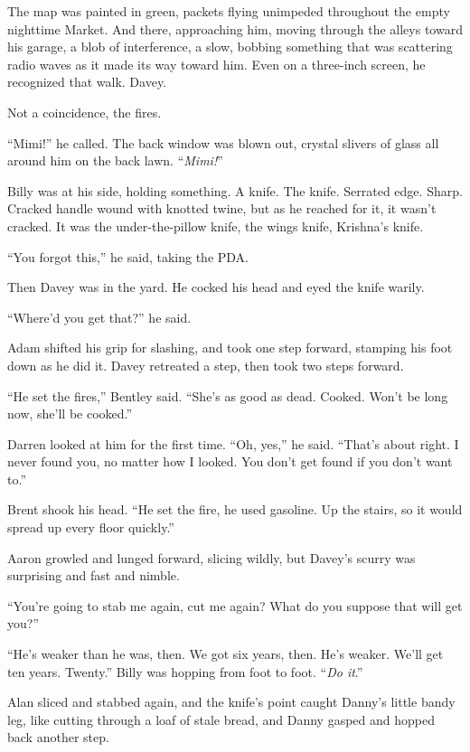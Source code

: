 \documentclass{article}
\begin{document}
The map was painted in green, packets flying unimpeded throughout the
empty nighttime Market.  And there, approaching him, moving through
the alleys toward his garage, a blob of interference, a slow, bobbing
something that was scattering radio waves as it made its way toward
him.  Even on a three-inch screen, he recognized that walk.  Davey.

Not a coincidence, the fires.

``Mimi!'' he called.  The back window was blown out, crystal slivers
of glass all around him on the back lawn.  ``\textit{Mimi!}''

Billy was at his side, holding something.  A knife.  The knife. 
Serrated edge.  Sharp.  Cracked handle wound with knotted twine, but
as he reached for it, it wasn't cracked.  It was the under-the-pillow
knife, the wings knife, Krishna's knife.

``You forgot this,'' he said, taking the PDA.

Then Davey was in the yard.  He cocked his head and eyed the knife
warily.

``Where'd you get that?'' he said.

Adam shifted his grip for slashing, and took one step forward,
stamping his foot down as he did it.  Davey retreated a step, then
took two steps forward.

``He set the fires,'' Bentley said.  ``She's as good as dead.  Cooked. 
Won't be long now, she'll be cooked.''

Darren looked at him for the first time.  ``Oh, yes,'' he said. 
``That's about right.  I never found you, no matter how I looked.  You
don't get found if you don't want to.''

Brent shook his head.  ``He set the fire, he used gasoline.  Up the
stairs, so it would spread up every floor quickly.''

Aaron growled and lunged forward, slicing wildly, but Davey's scurry
was surprising and fast and nimble.

``You're going to stab me again, cut me again?  What do you suppose
that will get you?''

``He's weaker than he was, then.  We got six years, then.  He's
weaker.  We'll get ten years.  Twenty.'' Billy was hopping from foot
to foot.  ``\textit{Do it}.''

Alan sliced and stabbed again, and the knife's point caught Danny's
little bandy leg, like cutting through a loaf of stale bread, and
Danny gasped and hopped back another step.
\end{document}
